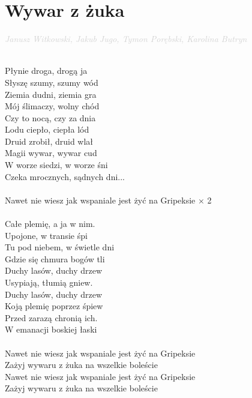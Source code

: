 \documentclass[a5paper, 10pt]{book}
\begin{document}
\newpage
\section{Wywar z żuka}\textcolor{lightgray}{\textit{Janusz Witkowski, Jakub Jugo, Tymon Porębski, Karolina Butryn}}\\~\\
\begin{minipage}[t]{0.85\textwidth}
  Płynie droga, drogą ja             \\
  Słyszę szumy, szumy wód\\
  Ziemia dudni, ziemia gra      \\
  Mój ślimaczy, wolny chód   \\
  Czy to nocą, czy za dnia          \\
  Lodu ciepło, ciepła lód\\
  Druid zrobił, druid wlał             \\
  Magii wywar, wywar cud\\
  \hspace*{3mm}W worze siedzi, w worze śni     \\
  \hspace*{3mm}Czeka mrocznych, sądnych dni...\\
  \\
  \hspace*{6mm}Nawet nie wiesz jak wspaniale jest żyć na Gripeksie $\times$ 2 \\
  \\
  Całe plemię, a ja w nim.       \\
  Upojone, w transie śpi\\
  Tu pod niebem, w świetle dni\\
  Gdzie się chmura bogów tli   \\
  Duchy lasów, duchy drzew      \\
  Usypiają, tłumią gniew.      \\
  Duchy lasów, duchy drzew    \\
  Koją plemię poprzez śpiew    \\
  \hspace*{3mm}Przed zarazą chronią ich.       \\
  \hspace*{3mm}W emanacji boskiej łaski\\
  \\
  \hspace*{6mm}Nawet nie wiesz jak wspaniale jest żyć na Gripeksie        \\
  \hspace*{6mm}Zażyj wywaru z żuka na wszelkie boleście           	       \\
  \hspace*{6mm}Nawet nie wiesz jak wspaniale jest żyć na Gripeksie        \\
  \hspace*{6mm}Zażyj wywaru z żuka na wszelkie boleście   \\


\end{minipage}
\end{document}
